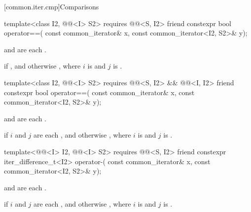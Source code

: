 [common.iter.cmp]{Comparisons}

%
\begin{itemdecl}
template<class I2, @@<I> S2>
  requires @@<S, I2>
friend constexpr bool operator==(
  const common_iterator& x, const common_iterator<I2, S2>& y);
\end{itemdecl}

\begin{itemdescr}
\pnum
\hardexpects
{} and 
are each .

\pnum
\returns
{} if ,
and otherwise ,
where $i$ is  and $j$ is .
\end{itemdescr}

%
\begin{itemdecl}
template<class I2, @@<I> S2>
  requires @@<S, I2> && @@<I, I2>
friend constexpr bool operator==(
  const common_iterator& x, const common_iterator<I2, S2>& y);
\end{itemdecl}

\begin{itemdescr}
\pnum
\hardexpects
{} and 
are each .

\pnum
\returns
{} if $i$ and $j$ are each , and otherwise
, where
$i$ is  and $j$ is .
\end{itemdescr}

%
\begin{itemdecl}
template<@@<I> I2, @@<I> S2>
  requires @@<S, I2>
friend constexpr iter_difference_t<I2> operator-(
  const common_iterator& x, const common_iterator<I2, S2>& y);
\end{itemdecl}

\begin{itemdescr}
\pnum
\hardexpects
{} and 
are each .

\pnum
\returns
{} if $i$ and $j$ are each , and otherwise
, where
$i$ is  and $j$ is .
\end{itemdescr}

